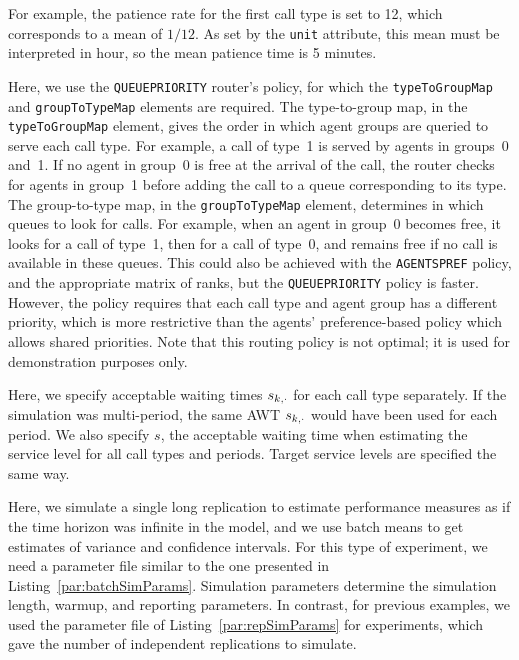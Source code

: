 For example, the patience rate for the first call type is set to 12,
which corresponds to a mean of $1/12$.
As set by the \texttt{unit} attribute, this mean must be interpreted
in hour, so the mean patience time is 5 minutes.

Here, we use the \texttt{QUEUEPRIORITY}
router's policy, for
which the \texttt{type\-To\-Group\-Map} and
\texttt{group\-To\-Type\-Map} elements are required.
The type-to-group map, in the \texttt{type\-To\-Group\-Map} element,
gives the order in which agent groups are
queried to serve each call type.  For example, a call of type~1 is served
by agents in groups~0 and~1.  If no agent in group~0 is free at the
arrival of the call, the
router checks for agents in group~1 before adding the call to a queue
corresponding to its type.
The group-to-type map, in the \texttt{group\-To\-Type\-Map} element,
determines in which queues to look for calls.
For example,
when an agent in group~0 becomes free, it looks for a call of type~1,
then for a call of type~0, and remains free if no call is available in
these queues.  This could also be achieved with the
\texttt{AGENTSPREF} policy, and the appropriate matrix of ranks, but the
\texttt{QUEUEPRIORITY} policy is faster.
However, the policy requires that each call type and agent group has a
different priority, which is more restrictive than the agents'
preference-based policy which allows shared priorities.
Note that this routing policy is not optimal;  it is
used for demonstration purposes only.

Here, we specify acceptable waiting times $\sK{k}$ for each call type
separately.  If the simulation was multi-period, the same AWT $\sK{k}$
would have been used for each period.  We also specify $s$, the
acceptable waiting time when estimating the service level for all call
types and periods.  Target service levels are specified the same way.

Here, we simulate a single long replication to estimate performance
measures as if the time horizon was infinite in the model, and we use
batch means to get estimates of variance and confidence intervals.
For this type of experiment, we need a parameter file similar to
the one presented in
Listing~\ref{par:batchSimParams}.
Simulation parameters determine the simulation length, warmup, and
reporting parameters.
In contrast, for previous examples, we used the parameter file
of Listing~\ref{par:repSimParams} for experiments, which gave the
number of independent replications to simulate.



